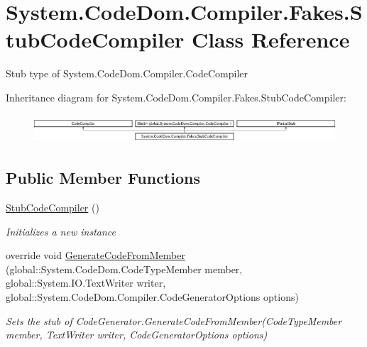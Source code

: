 \hypertarget{class_system_1_1_code_dom_1_1_compiler_1_1_fakes_1_1_stub_code_compiler}{\section{System.\-Code\-Dom.\-Compiler.\-Fakes.\-Stub\-Code\-Compiler Class Reference}
\label{class_system_1_1_code_dom_1_1_compiler_1_1_fakes_1_1_stub_code_compiler}
}


Stub type of System.\-Code\-Dom.\-Compiler.\-Code\-Compiler 


Inheritance diagram for System.\-Code\-Dom.\-Compiler.\-Fakes.\-Stub\-Code\-Compiler\-:\begin{figure}[H]
\begin{center}
\leavevmode
\includegraphics[height=1.075889cm]{class_system_1_1_code_dom_1_1_compiler_1_1_fakes_1_1_stub_code_compiler}
\end{center}
\end{figure}
\subsection*{Public Member Functions}
\begin{DoxyCompactItemize}
\item 
\hyperlink{class_system_1_1_code_dom_1_1_compiler_1_1_fakes_1_1_stub_code_compiler_a2e55af7f5cbdb6819cc571c9c34057dd}{Stub\-Code\-Compiler} ()
\begin{DoxyCompactList}\small\item\em Initializes a new instance\end{DoxyCompactList}\item 
override void \hyperlink{class_system_1_1_code_dom_1_1_compiler_1_1_fakes_1_1_stub_code_compiler_abad3222b2037055940d1418b7891437d}{Generate\-Code\-From\-Member} (global\-::\-System.\-Code\-Dom.\-Code\-Type\-Member member, global\-::\-System.\-I\-O.\-Text\-Writer writer, global\-::\-System.\-Code\-Dom.\-Compiler.\-Code\-Generator\-Options options)
\begin{DoxyCompactList}\small\item\em Sets the stub of Code\-Generator.\-Generate\-Code\-From\-Member(\-Code\-Type\-Member member, Text\-Writer writer, Code\-Generator\-Options options)\end{DoxyCompactList}\end{DoxyCompactItemize}

